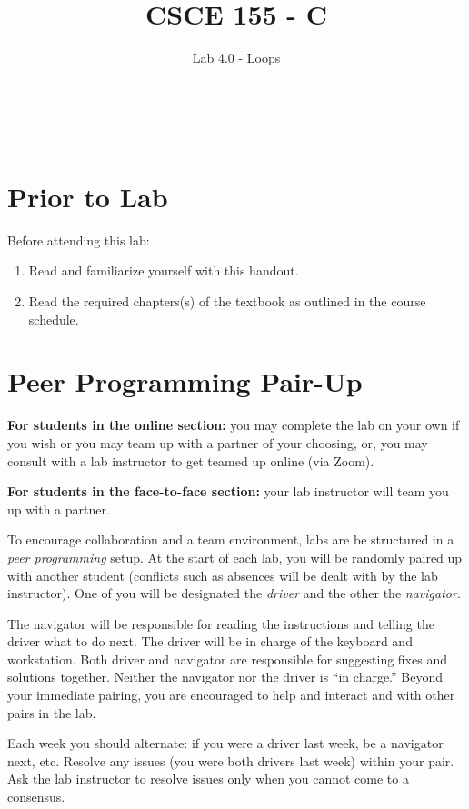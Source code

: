 \documentclass[12pt]{scrartcl}
\title{CSCE 155 - C}
\subtitle{Lab 4.0 - Loops}
\author{~}
\date{~}
\begin{document}
\maketitle

\section*{Prior to Lab}

Before attending this lab:
\begin{enumerate}
  \item Read and familiarize yourself with this handout.
  \item Read the required chapters(s) of the textbook as 
  outlined in the course schedule.
\end{enumerate}

\section*{Peer Programming Pair-Up}

\textbf{For students in the online section:} you may complete
the lab on your own if you wish or you may team up with a partner
of your choosing, or, you may consult with a lab instructor to get
teamed up online (via Zoom).

\textbf{For students in the face-to-face section:} your
lab instructor will team you up with a partner.  

To encourage collaboration and a team environment, labs are be
structured in a \emph{peer programming} setup.  At the start of
each lab, you will be randomly paired up with another student 
(conflicts such as absences will be dealt with by the lab instructor).
One of you will be designated the \emph{driver} and the other
the \emph{navigator}.  

The navigator will be responsible for reading the instructions and
telling the driver what to do next.  The driver will be in charge of the
keyboard and workstation.  Both driver and navigator are responsible
for suggesting fixes and solutions together.  Neither the navigator
nor the driver is ``in charge.''  Beyond your immediate pairing, you
are encouraged to help and interact and with other pairs in the lab.

Each week you should alternate: if you were a driver last week, 
be a navigator next, etc.  Resolve any issues (you were both drivers
last week) within your pair.  Ask the lab instructor to resolve issues
only when you cannot come to a consensus.  
\end{document}
